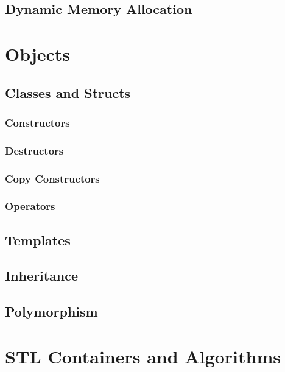 \documentclass[11pt,fancy,authoryear]{elegantbook}
\begin{document}
\section{Dynamic Memory Allocation}

\chapter{Objects}

\section{Classes and Structs}

\subsection{Constructors}

\subsection{Destructors}

\subsection{Copy Constructors}

\subsection{Operators}

\section{Templates}

\section{Inheritance}

\section{Polymorphism}

\chapter{STL Containers and Algorithms}
\end{document}

